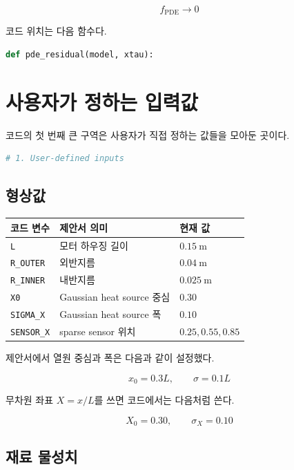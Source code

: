 \documentclass[11pt]{article}
\begin{document}
\begin{equation}
f_{\mathrm{PDE}} \rightarrow 0
\end{equation}

코드 위치는 다음 함수다.

\begin{lstlisting}[language=Python]
def pde_residual(model, xtau):
\end{lstlisting}

\section{사용자가 정하는 입력값}

코드의 첫 번째 큰 구역은 사용자가 직접 정하는 값들을 모아둔 곳이다.

\begin{lstlisting}[language=Python]
# 1. User-defined inputs
\end{lstlisting}

\subsection{형상값}

\begin{center}
\begin{tabular}{lll}
\toprule
코드 변수 & 제안서 의미 & 현재 값 \\
\midrule
\texttt{L} & 모터 하우징 길이 & \(0.15~\mathrm{m}\) \\
\texttt{R\_OUTER} & 외반지름 & \(0.04~\mathrm{m}\) \\
\texttt{R\_INNER} & 내반지름 & \(0.025~\mathrm{m}\) \\
\texttt{X0} & Gaussian heat source 중심 & \(0.30\) \\
\texttt{SIGMA\_X} & Gaussian heat source 폭 & \(0.10\) \\
\texttt{SENSOR\_X} & sparse sensor 위치 & \(0.25, 0.55, 0.85\) \\
\bottomrule
\end{tabular}
\end{center}

제안서에서 열원 중심과 폭은 다음과 같이 설정했다.

\[
x_0 = 0.3L,
\qquad
\sigma = 0.1L
\]

무차원 좌표 \(X=x/L\)를 쓰면 코드에서는 다음처럼 쓴다.

\[
X_0 = 0.30,
\qquad
\sigma_X = 0.10
\]

\subsection{재료 물성치}
\end{document}
